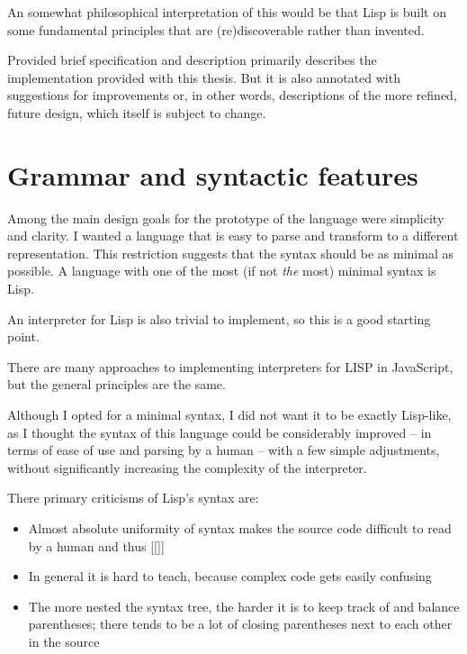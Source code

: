 An somewhat philosophical interpretation of this would be that Lisp is built on
some fundamental principles that are (re)discoverable rather than invented.



Provided brief specification and description primarily describes the
implementation provided with this thesis. But it is also annotated with
suggestions for improvements or, in other words, descriptions of the more
refined, future design, which itself is subject to change.

\section{Grammar and syntactic features}
Among the main design goals for the prototype of the language were simplicity
and clarity. I wanted a language that is easy to parse and transform to a
different representation. This restriction suggests that the syntax should be as
minimal as possible. A language with one of the most (if not \textit{the} most)
minimal syntax is Lisp\cite{syntaxation}.

An interpreter for Lisp is also trivial to implement, so this is a good starting
point.

There are many approaches to implementing interpreters for LISP in
JavaScript\cite{js_lisps}, but
the general principles are the same.

Although I opted for a minimal syntax, I did not want it to be exactly
Lisp-like, as I thought the syntax of this language could be considerably
improved -- in terms of ease of use and parsing by a human -- with a few simple
adjustments, without significantly increasing the complexity of the interpreter.

There primary criticisms of Lisp's syntax are:
\begin{itemize}
    \item Almost absolute uniformity of syntax makes the source code difficult
      to read by a human and thus [[]]
    \item In general it is hard to teach\cite{wadler_critique}, because complex
      code gets easily confusing
    \item The more nested the syntax tree, the harder it is to keep track of and
      balance parentheses; there tends to be a lot of closing parentheses next
      to each other in the
      source\cite{c2_parentheses}
\end{itemize}

